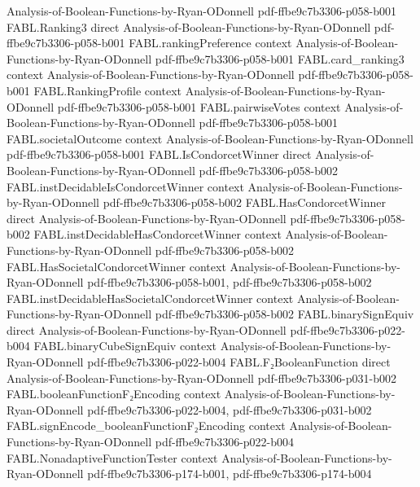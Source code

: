 \begin{theorem}
  {Analysis-of-Boolean-Functions-by-Ryan-ODonnell}
  {pdf-ffbe9c7b3306-p058-b001}
\proofstep
  {FABL.Ranking3}
  {direct}
  {Analysis-of-Boolean-Functions-by-Ryan-ODonnell}
  {pdf-ffbe9c7b3306-p058-b001}
\proofstep
  {FABL.rankingPreference}
  {context}
  {Analysis-of-Boolean-Functions-by-Ryan-ODonnell}
  {pdf-ffbe9c7b3306-p058-b001}
\proofstep
  {FABL.card_ranking3}
  {context}
  {Analysis-of-Boolean-Functions-by-Ryan-ODonnell}
  {pdf-ffbe9c7b3306-p058-b001}
\proofstep
  {FABL.RankingProfile}
  {context}
  {Analysis-of-Boolean-Functions-by-Ryan-ODonnell}
  {pdf-ffbe9c7b3306-p058-b001}
\proofstep
  {FABL.pairwiseVotes}
  {context}
  {Analysis-of-Boolean-Functions-by-Ryan-ODonnell}
  {pdf-ffbe9c7b3306-p058-b001}
\proofstep
  {FABL.societalOutcome}
  {context}
  {Analysis-of-Boolean-Functions-by-Ryan-ODonnell}
  {pdf-ffbe9c7b3306-p058-b001}
\proofstep
  {FABL.IsCondorcetWinner}
  {direct}
  {Analysis-of-Boolean-Functions-by-Ryan-ODonnell}
  {pdf-ffbe9c7b3306-p058-b002}
\proofstep
  {FABL.instDecidableIsCondorcetWinner}
  {context}
  {Analysis-of-Boolean-Functions-by-Ryan-ODonnell}
  {pdf-ffbe9c7b3306-p058-b002}
\proofstep
  {FABL.HasCondorcetWinner}
  {direct}
  {Analysis-of-Boolean-Functions-by-Ryan-ODonnell}
  {pdf-ffbe9c7b3306-p058-b002}
\proofstep
  {FABL.instDecidableHasCondorcetWinner}
  {context}
  {Analysis-of-Boolean-Functions-by-Ryan-ODonnell}
  {pdf-ffbe9c7b3306-p058-b002}
\proofstep
  {FABL.HasSocietalCondorcetWinner}
  {context}
  {Analysis-of-Boolean-Functions-by-Ryan-ODonnell}
  {pdf-ffbe9c7b3306-p058-b001,
    pdf-ffbe9c7b3306-p058-b002}
\proofstep
  {FABL.instDecidableHasSocietalCondorcetWinner}
  {context}
  {Analysis-of-Boolean-Functions-by-Ryan-ODonnell}
  {pdf-ffbe9c7b3306-p058-b002}
\proofstep
  {FABL.binarySignEquiv}
  {direct}
  {Analysis-of-Boolean-Functions-by-Ryan-ODonnell}
  {pdf-ffbe9c7b3306-p022-b004}
\proofstep
  {FABL.binaryCubeSignEquiv}
  {context}
  {Analysis-of-Boolean-Functions-by-Ryan-ODonnell}
  {pdf-ffbe9c7b3306-p022-b004}
\proofstep
  {FABL.F₂BooleanFunction}
  {direct}
  {Analysis-of-Boolean-Functions-by-Ryan-ODonnell}
  {pdf-ffbe9c7b3306-p031-b002}
\proofstep
  {FABL.booleanFunctionF₂Encoding}
  {context}
  {Analysis-of-Boolean-Functions-by-Ryan-ODonnell}
  {pdf-ffbe9c7b3306-p022-b004,
    pdf-ffbe9c7b3306-p031-b002}
\proofstep
  {FABL.signEncode_booleanFunctionF₂Encoding}
  {context}
  {Analysis-of-Boolean-Functions-by-Ryan-ODonnell}
  {pdf-ffbe9c7b3306-p022-b004}
\proofstep
  {FABL.NonadaptiveFunctionTester}
  {context}
  {Analysis-of-Boolean-Functions-by-Ryan-ODonnell}
  {pdf-ffbe9c7b3306-p174-b001,
    pdf-ffbe9c7b3306-p174-b004}

\end{theorem}
